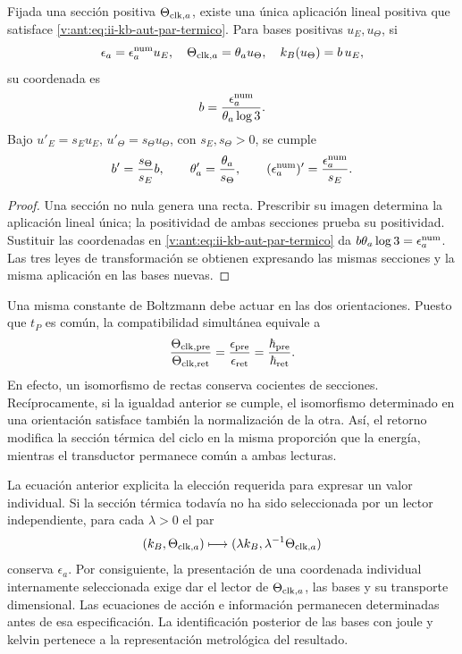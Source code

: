 \begin{theorem}
Fijada una sección positiva \(\Theta_{{\rm clk},a}\), existe una
única aplicación lineal positiva que satisface
\eqref{v:ant:eq:ii-kb-aut-par-termico}. Para bases positivas \(u_E,u_\Theta\),
si
\[
 \epsilon_a=\epsilon_a^{\rm num}u_E,\quad
 \Theta_{{\rm clk},a}=\theta_a u_\Theta,\quad
 k_B(u_\Theta)=b\,u_E,
\]
su coordenada es
\begin{equation}
 b=\frac{\epsilon_a^{\rm num}}{\theta_a\log3}.
 \label{v:ant:eq:ii-kb-aut-coordenada}
\end{equation}
Bajo \(u'_E=s_Eu_E\), \(u'_\Theta=s_\Theta u_\Theta\), con
\(s_E,s_\Theta>0\), se cumple
\[
 b'=\frac{s_\Theta}{s_E}b,\qquad
 \theta'_a=\frac{\theta_a}{s_\Theta},\qquad
 (\epsilon_a^{\rm num})'=\frac{\epsilon_a^{\rm num}}{s_E}.
\]
\end{theorem}
\begin{proof}
Una sección no nula genera una recta. Prescribir su imagen determina
la aplicación lineal única; la positividad de ambas secciones prueba
su positividad. Sustituir las coordenadas en
\eqref{v:ant:eq:ii-kb-aut-par-termico} da
\(b\theta_a\log3=\epsilon_a^{\rm num}\). Las tres leyes de
transformación se obtienen expresando las mismas secciones y la misma
aplicación en las bases nuevas.
\end{proof}

Una misma constante de Boltzmann debe actuar en las dos orientaciones.
Puesto que \(t_P\) es común, la compatibilidad simultánea equivale a
\begin{equation}
 \frac{\Theta_{{\rm clk},{\rm pre}}}{\Theta_{{\rm clk},{\rm ret}}}
 =\frac{\epsilon_{\rm pre}}{\epsilon_{\rm ret}}
 =\frac{\hbar_{\rm pre}}{\hbar_{\rm ret}}.
 \label{v:ant:eq:ii-kb-aut-orientaciones}
\end{equation}
En efecto, un isomorfismo de rectas conserva cocientes de secciones.
Recíprocamente, si la igualdad anterior se cumple, el isomorfismo
determinado en una orientación satisface también la normalización de
la otra. Así, el retorno modifica la sección térmica del ciclo en la
misma proporción que la energía, mientras el transductor permanece
común a ambas lecturas.

La ecuación anterior explicita la elección requerida para expresar un
valor individual. Si la sección térmica todavía no ha sido seleccionada
por un lector independiente, para cada \(\lambda>0\) el par
\[
 (k_B,\Theta_{{\rm clk},a})
 \longmapsto(\lambda k_B,\lambda^{-1}\Theta_{{\rm clk},a})
\]
conserva \(\epsilon_a\). Por consiguiente, la presentación de una
coordenada individual internamente seleccionada exige dar el lector de
\(\Theta_{{\rm clk},a}\), las bases y su transporte dimensional.
Las ecuaciones de acción e información permanecen determinadas antes
de esa especificación. La identificación posterior de las bases con
joule y kelvin pertenece a la representación metrológica del resultado.

